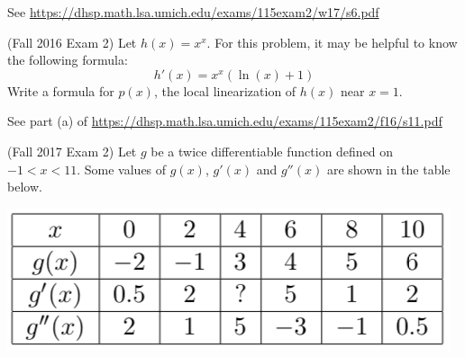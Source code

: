\documentclass[11pt]{exam}
\begin{document}
\begin{questions}
\begin{solution}
  See \href{https://dhsp.math.lsa.umich.edu/exams/115exam2/w17/s6.pdf}{https://dhsp.math.lsa.umich.edu/exams/115exam2/w17/s6.pdf}
\end{solution}
\vspace{0.4in}
\question (Fall 2016 Exam 2) %
  Let $h(x) = x^x$. For this problem, it may be helpful to know the following formula:
$$h'(x) = x^x (\ln(x)+1) %
$$
Write a formula for \(p(x)\), the local linearization of \(h(x)\) near
\(x=1\). 
\begin{solution}
  See part (a) of \href{https://dhsp.math.lsa.umich.edu/exams/115exam2/f16/s11.pdf}{https://dhsp.math.lsa.umich.edu/exams/115exam2/f16/s11.pdf}
\end{solution}
\pagebreak
\question (Fall 2017 Exam 2) %
	Let $g$ be a twice differentiable function defined on $-1 < x < 11$. Some values of $g(x)$, $g'(x)$ and $g''(x)$ are shown in the table below.
        \begin{center}
          \includegraphics[scale=0.4]{tableg}

\end{center}
\end{questions}
\end{document}
